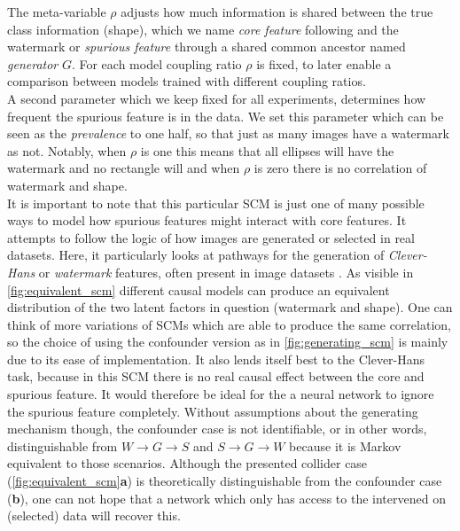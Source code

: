 The meta-variable $\rho$ adjusts how much information is shared between the true class information (shape), which we name \textit{core feature} following \cite{Singla2022} and the watermark or \textit{spurious feature} through a shared common ancestor named \textit{generator} $G$. For each model coupling ratio $\rho$ is fixed, to later enable a comparison between models trained with different coupling ratios. \\

A second parameter which we keep fixed for all experiments, determines how frequent the spurious feature is in the data. We set this parameter which can be seen as the \textit{prevalence} to one half, so that just as many images have a watermark as not. Notably, when $\rho$ is one this means that all ellipses will have the watermark and no rectangle will and when $\rho$ is zero there is no correlation of watermark and shape. \\

It is important to note that this particular SCM is just one of many possible ways to model how spurious features might interact with core features. It attempts to follow the logic of how images are generated or selected in real datasets. Here, it particularly looks at pathways for the generation of \textit{Clever-Hans} or \textit{watermark} features, often present in image datasets \cite{Lapuschkin2019}. As visible in \cref{fig:equivalent_scm} different causal models can produce an equivalent distribution of the two latent factors in question (watermark and shape). One can think of more variations of SCMs which are able to produce the same correlation, so the choice of using the confounder version as in \cref{fig:generating_scm} is mainly due to its ease of implementation. It also lends itself best to the Clever-Hans task, because in this SCM there is no real causal effect between the core and spurious feature. It would therefore be ideal for the a neural network to ignore the spurious feature completely. Without assumptions about the generating mechanism though, the confounder case is not identifiable, or in other words, distinguishable from $W \rightarrow G \rightarrow S$ and $S \rightarrow G \rightarrow W$ because it is Markov equivalent to those scenarios. 
Although the presented collider case (\cref{fig:equivalent_scm}\textbf{a}) is theoretically distinguishable from the confounder case (\textbf{b}), one can not hope that a network which only has access to the intervened on (selected) data will recover this. 

